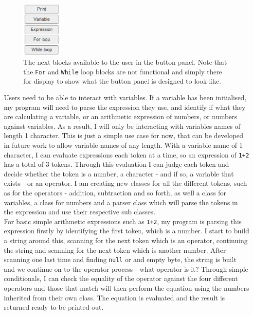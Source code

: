 \documentclass[a4paper, 12pt]{article}
\begin{document}
            \clearpage
            \begin{figure}[h]
                \centering
                \includegraphics[width=20mm]{updated_blocks.png}
                \caption{The next blocks available to the user in the button panel. Note that the
                \texttt{For} and \texttt{While} loop blocks are not functional and simply there
                for display to show what the button panel is designed to look like.}
            \end{figure}

            Users need to be able to interact with variables. If a variable has been initialised,
            my program will need to parse the expression they use, and identify if what they are
            calculating a variable, or an arithmetic expression of numbers, or numbers against
            variables. As a result, I will only be interacting with variables names of length
            1 character. This is just a simple use case for now, that can be developed in future
            work to allow variable names of any length. With a variable name of 1 character, I can
            evaluate expressions each token at a time, so an expression of \texttt{1+2} has a total
            of 3 tokens. Through this evaluation I can judge each token and decide whether the token
            is a number, a character - and if so, a variable that exists - or an operator. I am
            creating new classes for all the different tokens, such as for the operators - addition,
            subtraction and so forth, as well a class for variables, a class for numbers and a parser
            class which will parse the tokens in the expression and use their respective sub classes. \\

            For basic simple arithmetic expressions such as \texttt{1+2}, my program is parsing this
            expression firstly by identifying the first token, which is a number. I start to build a
            string around this, scanning for the next token which is an operator, continuing the string
            and scanning for the next token which is another number. After scanning one last time and
            finding \texttt{null} or and empty byte, the string is built and we continue on to the
            operator process - what operator is it? Through simple conditionals, I can check the equality
            of the operator against the four different operators and those that match will then perform
            the equation using the numbers inherited from their own class. The equation is evaluated and
            the result is returned ready to be printed out.
\end{document}
